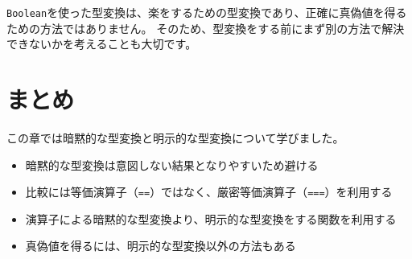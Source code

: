 \texttt{Boolean}を使った型変換は、楽をするための型変換であり、正確に真偽値を得るための方法ではありません。
そのため、型変換をする前にまず別の方法で解決できないかを考えることも大切です。

\hypertarget{conclusion}{%
\section{まとめ}\label{conclusion}}

この章では暗黙的な型変換と明示的な型変換について学びました。

\begin{itemize}
\item
  暗黙的な型変換は意図しない結果となりやすいため避ける
\item
  比較には等価演算子（\texttt{==}）ではなく、厳密等価演算子（\texttt{===}）を利用する
\item
  演算子による暗黙的な型変換より、明示的な型変換をする関数を利用する
\item
  真偽値を得るには、明示的な型変換以外の方法もある
\end{itemize}
